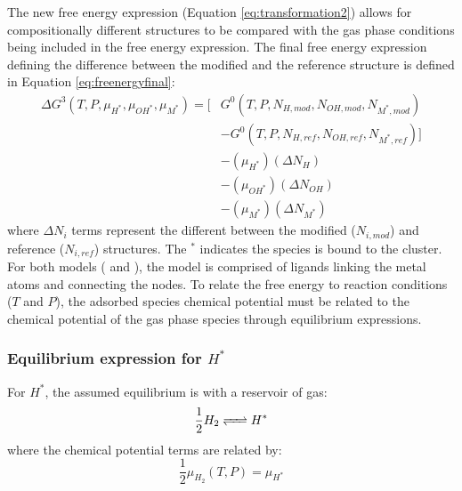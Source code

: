 \documentclass[12pt]{article}
\begin{document}
The new free energy expression (Equation \ref{eq:transformation2}) allows for compositionally different structures to be compared with the gas phase conditions being included in the free energy expression. The final free energy expression defining the difference between the modified and the reference structure is defined in Equation \ref{eq:freenergyfinal}:
\begin{equation}
    \begin{split}
        \Delta G^{3}(T,P,\mu_{H^{*}},\mu_{OH^{*}},\mu_{M^{*}}) = \Big[&G^{0}(T,P,N_{H,mod},N_{OH,mod},N_{M^{*},mod}) \\ &- G^{0}(T,P,N_{H,ref},N_{OH,ref},N_{M^{*},ref}) \Big] \\ &- (\mu_{H^{*}})(\Delta N_{H}) \\ &- (\mu_{OH^{*}})(\Delta N_{OH}) \\ &- (\mu_{M^{*}})(\Delta N_{M^{*}}) 
    \end{split}
    \label{eq:freenergyfinal}
\end{equation}
where $\Delta N_{i}$ terms represent the different between the modified ($N_{i,mod}$) and reference ($N_{i,ref}$) structures. The $^{*}$ indicates the species is bound to the cluster. For both models ( and ), the model is comprised of  ligands linking the metal atoms and connecting the  nodes. To relate the free energy to reaction conditions ($T$ and $P$), the adsorbed species chemical potential must be related to the chemical potential of the gas phase species through equilibrium expressions. \\ 

\subsubsection{Equilibrium expression for $H^{*}$}
For $H^{*}$, the assumed equilibrium is with a reservoir of  gas:
\begin{equation}
    \frac{1}{2} H_{2} \ce{<=>} H^{*}
\end{equation}
where the chemical potential terms are related by: 
\begin{equation}
    \frac{1}{2} \mu_{H_{2}}(T,P) = \mu_{H^{*}}
\end{equation}
\end{document}
